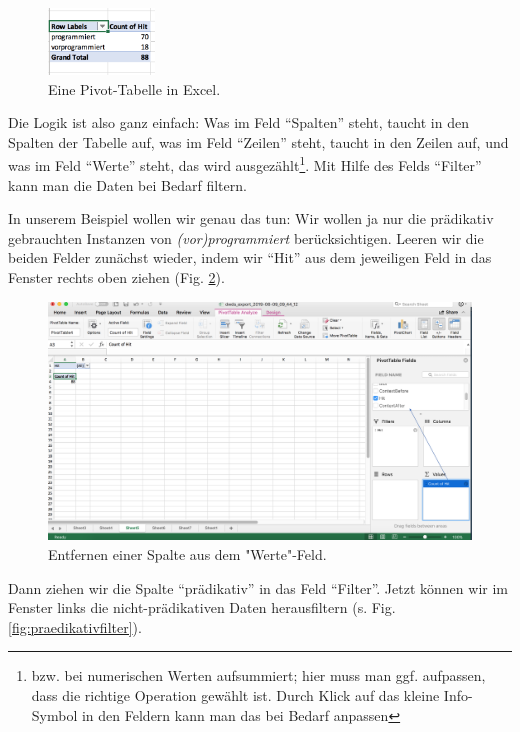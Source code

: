 \documentclass[]{article}
\let\rmarkdownfootnote\footnote%
\def\footnote{\protect\rmarkdownfootnote}
\begin{document}
\begin{figure}
\includegraphics[width=1.11in]{docs/fig/excel_simplepivot} \caption{Eine Pivot-Tabelle in Excel.}\label{fig:excelpivotsimple}
\end{figure}

Die Logik ist also ganz einfach: Was im Feld \enquote{Spalten} steht,
taucht in den Spalten der Tabelle auf, was im Feld \enquote{Zeilen}
steht, taucht in den Zeilen auf, und was im Feld \enquote{Werte} steht,
das wird ausgezählt\footnote{bzw. bei numerischen Werten aufsummiert;
  hier muss man ggf. aufpassen, dass die richtige Operation gewählt ist.
  Durch Klick auf das kleine Info-Symbol in den Feldern kann man das bei
  Bedarf anpassen}. Mit Hilfe des Felds \enquote{Filter} kann man die
Daten bei Bedarf filtern.

In unserem Beispiel wollen wir genau das tun: Wir wollen ja nur die
prädikativ gebrauchten Instanzen von \emph{(vor)programmiert}
berücksichtigen. Leeren wir die beiden Felder zunächst wieder, indem wir
\enquote{Hit} aus dem jeweiligen Feld in das Fenster rechts oben ziehen
(Fig. \ref{fig:countofhit}).

\begin{figure}
\includegraphics[width=6.36in]{docs/fig/countofhit} \caption{Entfernen einer Spalte aus dem "Werte"-Feld.}\label{fig:countofhit}
\end{figure}

Dann ziehen wir die Spalte \enquote{prädikativ} in das Feld
\enquote{Filter}. Jetzt können wir im Fenster links die
nicht-prädikativen Daten herausfiltern (s. Fig.
\ref{fig:praedikativfilter}).
\end{document}
